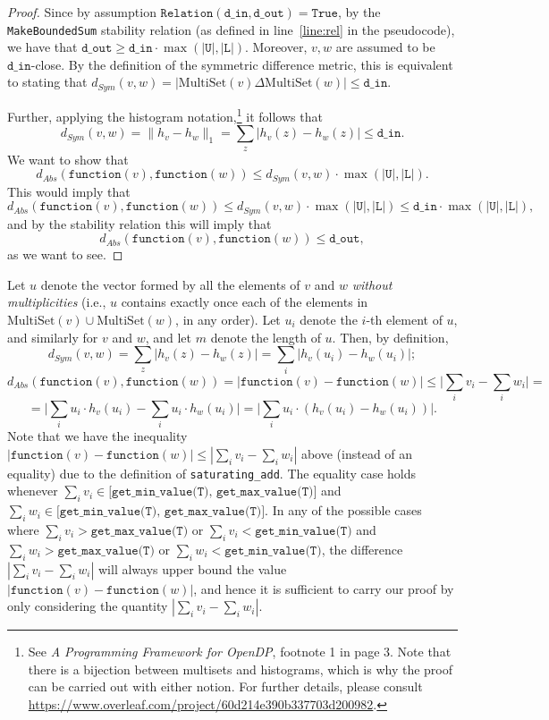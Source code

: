 \documentclass[11pt,a4paper]{article}
\theoremstyle{definition}
\newcommand{\MultiSet}{\mathrm{MultiSet}}
\newcommand{\din}{\texttt{d\_in}}
\newcommand{\dout}{\texttt{d\_out}}
\newcommand{\Relation}{\texttt{Relation}}
\newcommand{\True}{\texttt{True}}
\newcommand{\function}{\texttt{function}}
\begin{document}
\begin{proof}
    Since by assumption $\Relation(\din, \dout) = \True$, by the \texttt{MakeBoundedSum} stability relation (as defined in line~\ref{line:rel} in the pseudocode), we have that $\dout \geq \din \cdot \max{(|\texttt{U}|, |\texttt{L}|)}$. Moreover, $v, w$ are assumed to be $\din$-close. By the definition of the symmetric difference metric, this is equivalent to stating that $d_{Sym}(v, w) = |\MultiSet(v) \Delta \MultiSet(w)| \leq \din$.

    Further, applying the histogram notation,\footnote{See \textit{A Programming Framework for OpenDP}, footnote 1 in page 3. Note that there is a bijection between multisets and histograms, which is why the proof can be carried out with either notion. For further details, please consult \url{https://www.overleaf.com/project/60d214e390b337703d200982}.}  it follows that
    \[
        d_{Sym}(v, w) = \lVert h_{v} - h_{w}\rVert_1 = \sum_z |h_v(z) - h_w(z)| \leq \din.
    \]
    We want to show that
    \[
        d_{Abs}(\function(v), \function(w)) \leq d_{Sym}(v, w) \cdot \max{(|\texttt{U}|, |\texttt{L}|)}.
    \]
    This would imply that
    \[
        d_{Abs}(\function(v), \function(w)) \leq d_{Sym}(v, w) \cdot \max{(|\texttt{U}|, |\texttt{L}|)} \leq \din \cdot \max{(|\texttt{U}|, |\texttt{L}|)},
    \]
    and by the stability relation this will imply that
    \[
        d_{Abs}(\function(v), \function(w)) \leq \dout,
    \]
    as we want to see. 
\end{proof}

Let $u$ denote the vector formed by all the elements of $v$ and $w$ \textit{without multiplicities} (i.e., $u$ contains exactly once each of the elements in $\MultiSet(v) \cup \MultiSet(w)$, in any order). Let $u_i$ denote the $i$-th element of $u$, and similarly for $v$ and $w$, and let $m$ denote the length of $u$.  
Then, by definition,
\[
    d_{Sym}(v, w) = \sum_z \Big|h_v(z) - h_w(z)\Big| = \sum_i \Big|h_v(u_i) - h_w(u_i)\Big|;
\]
\[
    d_{Abs}(\function(v), \function(w)) = |\function(v) - \function(w)| \leq \Big|\sum_i v_i - \sum_i w_i\Big| = 
\]
\[
   = \Big|\sum_i u_i \cdot h_v(u_i) - \sum_i u_i \cdot h_w(u_i)\Big| = \Big|\sum_i u_i \cdot (h_v(u_i) - h_w(u_i))\Big|.
\]
Note that we have the inequality $|\function(v) - \function(w)| \leq |\sum_i v_i - \sum_i w_i|$ above (instead of an equality) due to the definition of \texttt{saturating\_add}. The equality case holds whenever $\sum_i v_i \in \texttt{[get\_min\_value(T), get\_max\_value(T)]}$ and $\sum_i w_i \in \texttt{[get\_min\_value(T),}$  $\texttt{get\_max\_value(T)]}$. In any of the possible cases where $\sum_i v_i > \texttt{get\_max\_value(T)}$ or $\sum_i v_i < \texttt{get\_min\_value(T)}$ and $\sum_i w_i > \texttt{get\_max\_value(T)}$ or $\sum_i w_i < \texttt{get\_min\_value(T)}$, the difference $|\sum_i v_i - \sum_i w_i|$ will always upper bound the value $|\function(v) - \function(w)|$, and hence it is sufficient to carry our proof by only considering the quantity $|\sum_i v_i - \sum_i w_i|$.
\end{document}
